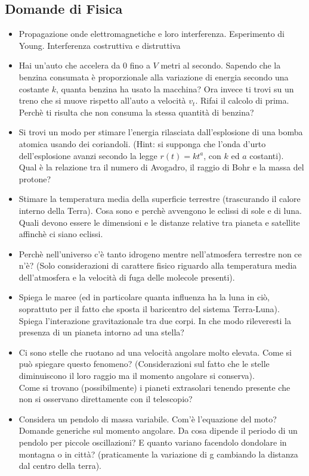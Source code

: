 \documentclass[a4paper,11pt]{article}
\begin{document}
\subsection*{Domande di Fisica}
\begin{itemize}
\item Propagazione onde elettromagnetiche e loro interferenza. Esperimento di Young. Interferenza costruttiva e distruttiva
\item Hai un'auto che accelera da $0$ fino a $V$ metri al secondo. Sapendo che la benzina consumata \`e proporzionale alla variazione di energia secondo una costante $k$, quanta benzina ha usato la macchina? Ora invece ti trovi su un treno che si muove rispetto all'auto a velocit\`a $v_t$. Rifai il calcolo di prima. Perch\`e ti risulta che non consuma la stessa quantit\`a di benzina?
\item Si trovi un modo per stimare l'energia rilasciata dall'esplosione di una bomba atomica usando dei coriandoli. (Hint: si supponga che l'onda d'urto dell'esplosione avanzi secondo la legge $r(t) = k t^a$, con $k$ ed $a$ costanti). \\ Qual \`e la relazione tra il numero di Avogadro, il raggio di Bohr e la massa del protone?
\item Stimare la temperatura media della superficie terrestre (trascurando il calore interno della Terra). Cosa sono e perch\`e avvengono le eclissi di sole e di luna. Quali devono essere le dimensioni e le distanze relative tra pianeta e satellite affinch\`e ci siano eclissi.
\item Perch\`e nell'universo c'\`e tanto idrogeno mentre nell'atmosfera terrestre non ce n'\`e? (Solo considerazioni di carattere fisico riguardo alla temperatura media dell'atmosfera e la velocità di fuga delle molecole presenti).
\item Spiega le maree (ed in particolare quanta influenza ha la luna in ci\`o, soprattuto per il fatto che sposta il baricentro del sistema Terra-Luna). Spiega l'interazione gravitazionale tra due corpi. In che modo rileveresti la presenza di un pianeta intorno ad una stella?
\item Ci sono stelle che ruotano ad una velocit\`a angolare molto elevata. Come si pu\`o spiegare questo fenomeno? (Considerazioni sul fatto che le stelle diminuiscono il loro raggio ma il momento angolare si conserva). \\ Come si trovano (possibilmente) i pianeti extrasolari tenendo presente che non si osservano direttamente con il telescopio?
\item Considera un pendolo di massa variabile. Com'\`e l'equazione del moto? \\ Domande generiche sul momento angolare. Da cosa dipende il periodo di un pendolo per piccole oscillazioni? E quanto variano facendolo dondolare in montagna o in città? (praticamente la variazione di g cambiando la distanza dal centro della terra).

\end{itemize}
\end{document}
